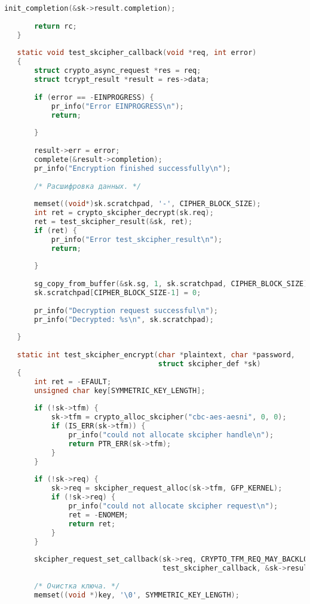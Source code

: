\begin{lstlisting}[language=c, label=rudakov-menya-ne-spaset, caption=Загружаемый модуль ядра]
       init_completion(&sk->result.completion);
    
       return rc;
   }
    
   static void test_skcipher_callback(void *req, int error)
   {
       struct crypto_async_request *res = req;
       struct tcrypt_result *result = res->data;
    
       if (error == -EINPROGRESS) {
           pr_info("Error EINPROGRESS\n");
           return;
   
       }
           
       result->err = error;
       complete(&result->completion);
       pr_info("Encryption finished successfully\n");
    
       /* Расшифровка данных. */
   
       memset((void*)sk.scratchpad, '-', CIPHER_BLOCK_SIZE);
       int ret = crypto_skcipher_decrypt(sk.req);
       ret = test_skcipher_result(&sk, ret);
       if (ret) {
           pr_info("Error test_skcipher_result\n");
           return;
   
       }
    
       sg_copy_from_buffer(&sk.sg, 1, sk.scratchpad, CIPHER_BLOCK_SIZE);
       sk.scratchpad[CIPHER_BLOCK_SIZE-1] = 0;
    
       pr_info("Decryption request successful\n");
       pr_info("Decrypted: %s\n", sk.scratchpad);
   
   }
    
   static int test_skcipher_encrypt(char *plaintext, char *password,
                                    struct skcipher_def *sk)
   {
       int ret = -EFAULT;
       unsigned char key[SYMMETRIC_KEY_LENGTH];
    
       if (!sk->tfm) {
           sk->tfm = crypto_alloc_skcipher("cbc-aes-aesni", 0, 0);
           if (IS_ERR(sk->tfm)) {
               pr_info("could not allocate skcipher handle\n");
               return PTR_ERR(sk->tfm);
           }
       }
    
       if (!sk->req) {
           sk->req = skcipher_request_alloc(sk->tfm, GFP_KERNEL);
           if (!sk->req) {
               pr_info("could not allocate skcipher request\n");
               ret = -ENOMEM;
               return ret;
           }
       }
    
       skcipher_request_set_callback(sk->req, CRYPTO_TFM_REQ_MAY_BACKLOG,
                                     test_skcipher_callback, &sk->result);
    
       /* Очистка ключа. */
       memset((void *)key, '\0', SYMMETRIC_KEY_LENGTH);
    

\end{lstlisting}
